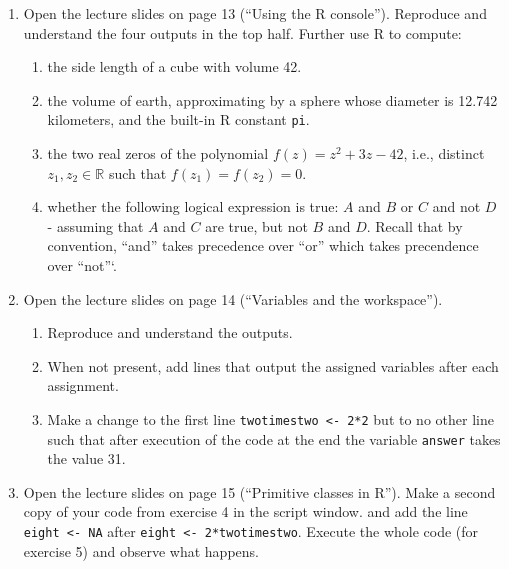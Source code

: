 \begin{enumerate}
\item Open the lecture slides on page 13 (``Using the R console''). Reproduce and understand the four outputs in the top half. Further use R to compute:
\begin{enumerate}
\item the side length of a cube with volume 42.
\item the volume of earth, approximating by a sphere whose diameter is 12.742 kilometers, and the built-in R constant \texttt{pi}.
\item the two real zeros of the polynomial $f(z) = z^2 + 3 z - 42$, i.e., distinct $z_1,z_2\in\mathbb{R}$ such that $f(z_1)=f(z_2)=0$.
\item whether the following logical expression is true: $A$ and $B$ or $C$ and not $D$ - assuming that $A$ and $C$ are true, but not $B$ and $D$. Recall that by convention, ``and'' takes precedence over ``or'' which takes precendence over ``not''`.
\end{enumerate}

\item Open the lecture slides on page 14 (``Variables and the workspace''). 
\begin{enumerate}
\item Reproduce and understand the outputs.
\item When not present, add lines that output the assigned variables after each assignment.
\item Make a change to the first line \texttt{twotimestwo <- 2*2} but to no other line such that after execution of the code at the end the variable \texttt{answer} takes the value 31.
\end{enumerate}

\item Open the lecture slides on page 15 (``Primitive classes in R''). Make a second copy of your code from exercise 4 in the script window. and add the line \texttt{eight <- NA} after \texttt{eight <- 2*twotimestwo}. Execute the whole code (for exercise 5) and observe what happens.


\end{enumerate}
